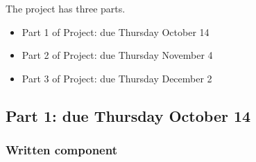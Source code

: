 The project has three parts. 
\begin{itemize}
    \item Part 1 of Project: due Thursday October 14
    \item Part 2 of Project: due Thursday November 4
    \item Part 3 of Project: due Thursday December 2
\end{itemize}

\newpage
\subsection*{Part 1: due Thursday October 14}
\subsubsection*{Written component}
